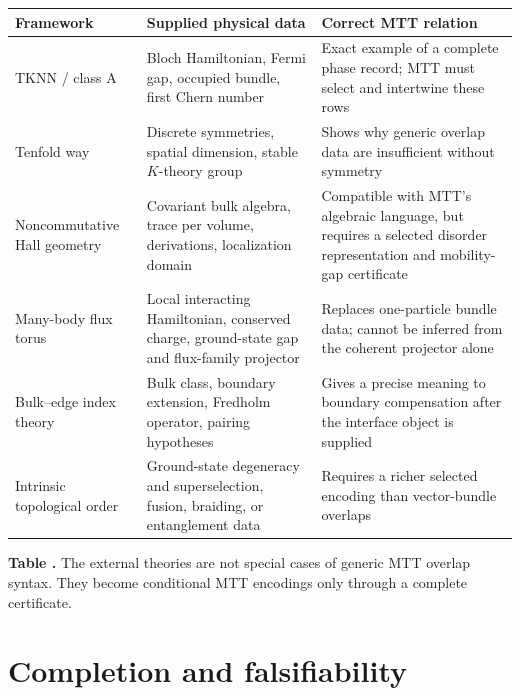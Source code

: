 \documentclass[11pt]{article}
\theoremstyle{definition}
\theoremstyle{remark}
\begin{document}
\begin{center}
\centering
\small
{}\label{tab:comparison}
\begin{tabularx}{\textwidth}{@{}>{\raggedright\arraybackslash}p{}Y Y@{}}
\toprule
Framework & Supplied physical data & Correct MTT relation \\
\midrule
TKNN / class A
& Bloch Hamiltonian, Fermi gap, occupied bundle, first Chern number
& Exact example of a complete phase record; MTT must select and intertwine
  these rows \\
Tenfold way
& Discrete symmetries, spatial dimension, stable \(K\)-theory group
& Shows why generic overlap data are insufficient without symmetry \\
Noncommutative Hall geometry
& Covariant bulk algebra, trace per volume, derivations, localization domain
& Compatible with MTT's algebraic language, but requires a selected
  disorder representation and mobility-gap certificate \\
Many-body flux torus
& Local interacting Hamiltonian, conserved charge, ground-state gap and
  flux-family projector
& Replaces one-particle bundle data; cannot be inferred from the coherent
  projector alone \\
Bulk--edge index theory
& Bulk class, boundary extension, Fredholm operator, pairing hypotheses
& Gives a precise meaning to boundary compensation after the interface
  object is supplied \\
Intrinsic topological order
& Ground-state degeneracy and superselection, fusion, braiding, or
  entanglement data
& Requires a richer selected encoding than vector-bundle overlaps \\
\bottomrule
\end{tabularx}
\par\smallskip
\begin{minipage}{0.98\textwidth}
\small\textbf{Table \thetable.}
The external theories are not special cases of generic MTT overlap
syntax.  They become conditional MTT encodings only through a complete
certificate.
\end{minipage}
\end{center}

\section{Completion and falsifiability}
\end{document}
